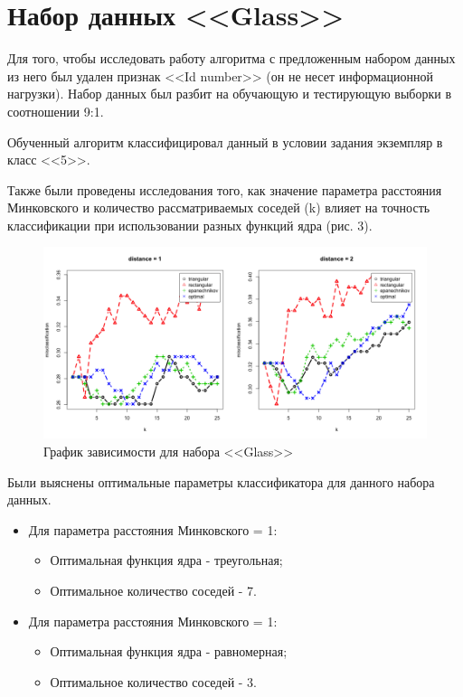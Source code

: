 \documentclass[]{article}
\numberwithin{equation}{section}
\begin{document}
    \section{Набор данных <<Glass>>}
        Для того, чтобы исследовать работу алгоритма с предложенным набором данных из него был удален признак <<Id number>> (он не несет информационной нагрузки). Набор данных был разбит на обучающую и тестирующую выборки в соотношении 9:1.

        Обученный алгоритм классифицировал данный в условии задания экземпляр в класс <<5>>.

        Также были проведены исследования того, как значение параметра расстояния Минковского и количество рассматриваемых соседей (k) влияет на точность классификации при использовании разных функций ядра (рис. 3).

        \begin{figure}[H]
            \centering
            \includegraphics[width = 1.0\linewidth]{data/glass_distance.png}
            \caption{График зависимости для набора <<Glass>>}
        \end{figure}

        Были выяснены оптимальные параметры классификатора для данного набора данных.
        \begin{itemize}
            \item Для параметра расстояния Минковского = 1:
                \begin{itemize}
                    \item Оптимальная функция ядра - треугольная;
                    \item Оптимальное количество соседей - 7.
                \end{itemize}
            \item Для параметра расстояния Минковского = 1:
                \begin{itemize}
                    \item Оптимальная функция ядра - равномерная;
                    \item Оптимальное количество соседей - 3.
                \end{itemize}
        \end{itemize}
\end{document}

